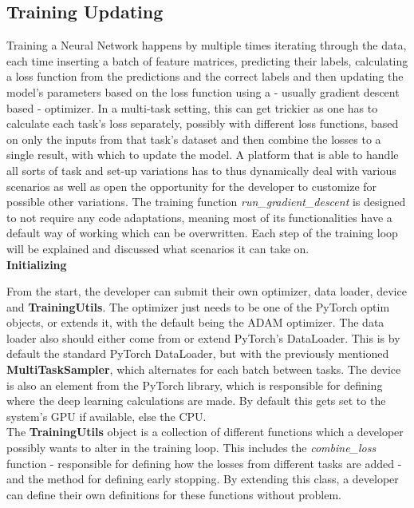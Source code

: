 \subsection{Training Updating} \label{Impl:Training:Updating}

Training a Neural Network happens by multiple times iterating through the data, each time inserting a batch of feature matrices, predicting their labels, calculating a loss function from the predictions and the correct labels and then updating the model's parameters based on the loss function using a - usually gradient descent based - optimizer. In a multi-task setting, this can get trickier as one has to calculate each task's loss separately, possibly with different loss functions, based on only the inputs from that task's dataset and then combine the losses to a single result, with which to update the model. A platform that is able to handle all sorts of task and set-up variations has to thus dynamically deal with various scenarios as well as open the opportunity for the developer to customize for possible other variations. The training function \textit{run\_gradient\_descent} is designed to not require any code adaptations, meaning most of its functionalities have a default way of working which can be overwritten. Each step of the training loop will be explained and discussed what scenarios it can take on. \\

\textbf{Initializing}

From the start, the developer can submit their own optimizer, data loader, device and \textbf{TrainingUtils}. The optimizer just needs to be one of the PyTorch optim objects, or extends it, with the default being the ADAM optimizer. The data loader also should either come from or extend PyTorch's DataLoader. This is by default the standard PyTorch DataLoader, but with the previously mentioned \textbf{MultiTaskSampler}, which alternates for each batch between tasks. The device is also an element from the PyTorch library, which is responsible for defining where the deep learning calculations are made. By default this gets set to the system's GPU if available, else the CPU. \\

The \textbf{TrainingUtils} object is a collection of different functions which a developer possibly wants to alter in the training loop. This includes the \textit{combine\_loss} function - responsible for defining how the losses from different tasks are added - and the method for defining early stopping. By extending this class, a developer can define their own definitions for these functions without problem. \\

